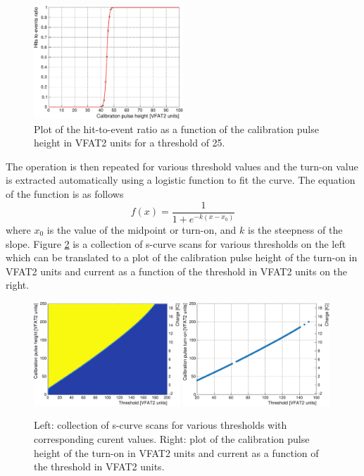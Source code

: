       \begin{figure}[h!]
        \centering
        \includegraphics[width=0.5\textwidth]{img/plots/cSCurve_T25-crop}
        \caption{Plot of the hit-to-event ratio as a function of the calibration pulse height in VFAT2 units for a threshold of 25.}
        \label{fig:II-4-scurve}
      \end{figure}

      The operation is then repeated for various threshold values and the turn-on value is extracted automatically using a logistic function to fit the curve. The equation of the function is as follows
      \begin{equation}
        \label{eq:II-4-logistic}
        f(x) = \frac{1}{1 + e^{-k \left( x - x_0 \right)}}
      \end{equation}
      where $ x_0 $ is the value of the midpoint or turn-on, and $ k $ is the steepness of the slope. Figure \ref{fig:II-4-scurves} is a collection of s-curve scans for various thresholds on the left which can be translated to a plot of the calibration pulse height of the turn-on in VFAT2 units and current as a function of the threshold in VFAT2 units on the right. \\

      \begin{figure}[h!]
        \centering
        \includegraphics[width=0.49\textwidth]{img/plots/cSCurve_ThresholdVCal-crop}
        \includegraphics[width=0.49\textwidth]{img/plots/cSCurve_TurnOn-crop}
        \caption{Left: collection of s-curve scans for various thresholds with corresponding curent values. Right: plot of the calibration pulse height of the turn-on in VFAT2 units and current as a function of the threshold in VFAT2 units.}
        \label{fig:II-4-scurves}
      \end{figure}

